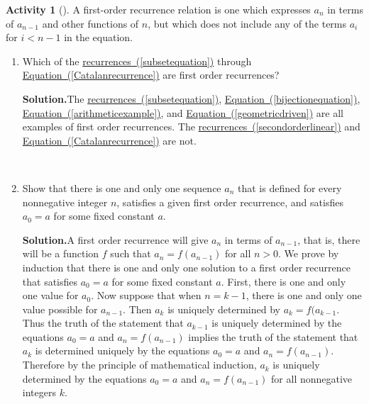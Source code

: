 \documentclass[10pt,]{book}
\theoremstyle{plain}
\theoremstyle{definition}
\newtheorem{activity}[project]{Activity}
\numberwithin{equation}{chapter}
\newcommand{\lt}{<}
\begin{document}
\begin{activity}[]\label{activity-38}
A first-order recurrence relation is one which expresses \(a_n\) in terms of \(a_{n-1}\) and other functions of \(n\), but which does not include any of the terms \(a_i\) for \(i\lt n-1\) in the equation.%
~\par
\begin{enumerate}[label=(\alph*)]
 \item Which of the \hyperref[subsetequation]{recurrences~(\ref{subsetequation})} through \hyperref[Catalanrecurrence]{Equation~(\ref{Catalanrecurrence})} are first order recurrences?%
\par\medskip\noindent%
\textbf{Solution.}\quad The \hyperref[subsetequation]{recurrences~(\ref{subsetequation})}, \hyperref[bijectionequation]{Equation~(\ref{bijectionequation})}, \hyperref[arithmeticexample]{Equation~(\ref{arithmeticexample})}, and \hyperref[geometricdriven]{Equation~(\ref{geometricdriven})} are all examples of first order recurrences. The \hyperref[secondorderlinear]{recurrences~(\ref{secondorderlinear})} and \hyperref[Catalanrecurrence]{Equation~(\ref{Catalanrecurrence})} are not.%

~\par
\item Show that there is one and only one sequence \(a_n\) that is defined for every nonnegative integer \(n\), satisfies a given first order recurrence, and satisfies \(a_0=a\) for some fixed constant \(a\).%
\par\medskip\noindent%
\textbf{Solution.}\quad A first order recurrence will give \(a_n\) in terms of \(a_{n-1}\), that is, there will be a function \(f\) such that \(a_n=f(a_{n-1})\) for all \(n>0\). We prove by induction that there is one and only one solution to a first order recurrence that satisfies \(a_0=a\) for some fixed constant \(a\). First, there is one and only one value for \(a_0\). Now suppose that when \(n=k-1\), there is one and only one value possible for \(a_{n-1}\). Then \(a_k\) is uniquely determined by \(a_k=f(a_{k-1}\). Thus the truth of the statement that \(a_{k-1}\) is uniquely determined by the equations \(a_0=a\) and \(a_n=f(a_{n-1})\) implies the truth of the statement that \(a_k\) is determined uniquely by the equations \(a_0=a\) and \(a_n=f(a_{n-1})\). Therefore by the principle of mathematical induction, \(a_k\) is uniquely determined by the equations \(a_0=a\) and \(a_n=f(a_{n-1})\) for all nonnegative integers \(k\).%

\end{enumerate}
\end{activity}
\end{document}
